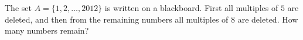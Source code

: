 The set $A=\{1,2,\dots,2012\}$ is written on a blackboard. First all multiples of $5$ are deleted, and then from the remaining numbers all multiples of $8$ are deleted. How many numbers remain?
